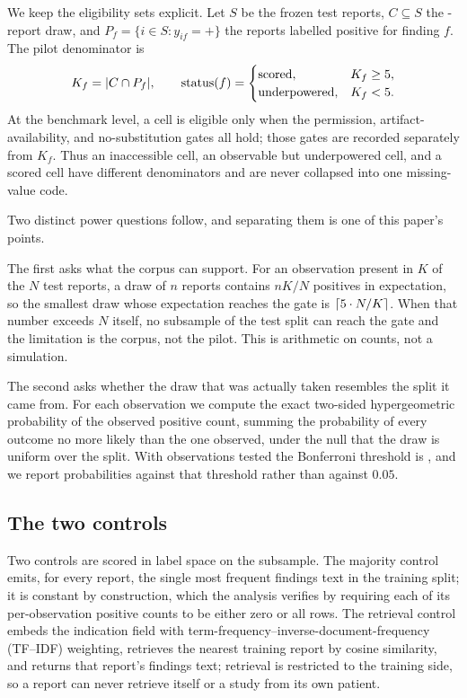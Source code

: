 We keep the eligibility sets explicit. Let \(S\) be the frozen test reports,
\(C\subseteq S\) the \NCohort{}-report draw, and \(P_f=\{i\in S:
y_{if}=+\}\) the reports labelled positive for finding \(f\). The pilot
denominator is
\[
  K_f = |C\cap P_f|,
  \qquad
  \mathrm{status}(f)=
  \begin{cases}
    \mathrm{scored}, & K_f\geq 5{},\\
    \mathrm{underpowered}, & K_f<5{}.
  \end{cases}
\]
At the benchmark level, a cell is eligible only when the permission,
artifact-availability, and no-substitution gates all hold; those gates are
recorded separately from \(K_f\). Thus an inaccessible cell, an observable but
underpowered cell, and a scored cell have different denominators and are never
collapsed into one missing-value code.

Two distinct power questions follow, and separating them is one of this paper's
points.

The first asks what the corpus can support. For an observation present in
\(K\) of the \(N\) test reports, a draw of \(n\) reports contains \(nK/N\)
positives in expectation, so the smallest draw whose expectation reaches the gate
is \(\lceil \text{5{}} \cdot N / K \rceil\). When that number exceeds
\(N\) itself, no subsample of the test split can reach the gate and the
limitation is the corpus, not the pilot. This is arithmetic on counts, not a
simulation.

The second asks whether the draw that was actually taken resembles the split it
came from. For each observation we compute the exact two-sided hypergeometric
probability of the observed positive count, summing the probability of every
outcome no more likely than the one observed, under the null that the draw is
uniform over the split. With \NFindings{} observations tested the Bonferroni
threshold is \Bonferroni{}, and we report probabilities against that threshold
rather than against \(0.05\).

\subsection{The two controls}

Two controls are scored in label space on the subsample. The majority control
emits, for every report, the single most frequent findings text in the training
split; it is constant by construction, which the analysis verifies by requiring
each of its per-observation positive counts to be either zero or all \NCohort{}
rows. The retrieval control embeds the indication field with term-frequency--inverse-document-frequency (TF--IDF) weighting, retrieves
the nearest training report by cosine similarity, and returns that report's
findings text; retrieval is restricted to the training side, so a report can
never retrieve itself or a study from its own patient.

